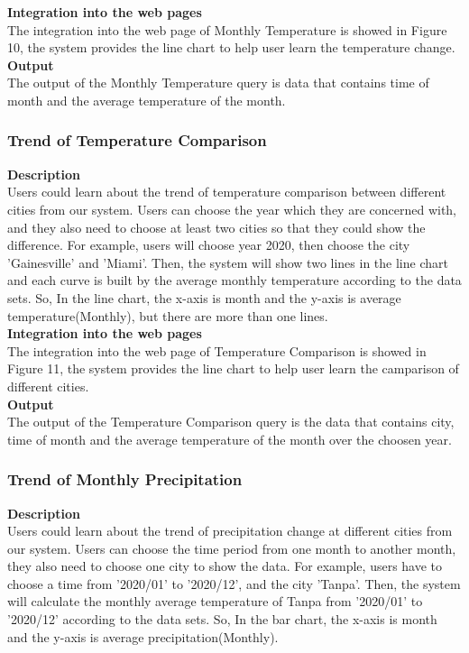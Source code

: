 \documentclass[]{article}
\begin{document}
	\noindent \textbf{Integration into the web pages} \\
	\noindent The integration into the web page of Monthly Temperature is showed in Figure 10, the system provides the line chart to help user learn the temperature change.   \\
	
	\noindent \textbf{Output} \\
	\noindent The output of the Monthly Temperature query is data that contains time of month and the average temperature of the month.  
	
	\subsubsection{Trend of Temperature Comparison}

	\textbf{Description} \\
	\noindent Users could learn about the trend of temperature comparison between different cities from our system. Users can choose the year which they are concerned with, and they also need to choose at least two cities so that they could show the difference. For example, users will choose year 2020, then choose the city 'Gainesville' and 'Miami'. Then, the system will show two lines in the line chart and each curve is built by the average monthly temperature according to the data sets. So, In the line chart, the x-axis is month and the y-axis is average temperature(Monthly), but there are more than one lines.    \\

	\noindent \textbf{Integration into the web pages} \\
	\noindent The integration into the web page of Temperature Comparison is showed in Figure 11, the system provides the line chart to help user learn the camparison of different cities.    \\
	
	\noindent \textbf{Output} \\
	\noindent The output of the Temperature Comparison query is the data that contains city, time of month and the average temperature of the month over the choosen year.  
	
	\subsubsection{Trend of Monthly Precipitation}
	
	\textbf{Description} \\
	\noindent Users could learn about the trend of precipitation change at different cities from our system. Users can choose the time period from one month to another month, they also need to choose one city to show the data. For example, users have to choose a time from '2020/01' to '2020/12', and the city 'Tanpa'. Then, the system will calculate the monthly average temperature of Tanpa from '2020/01' to '2020/12' according to the data sets. So, In the bar chart, the x-axis is month and the y-axis is average precipitation(Monthly).    \\
	
\end{document}
